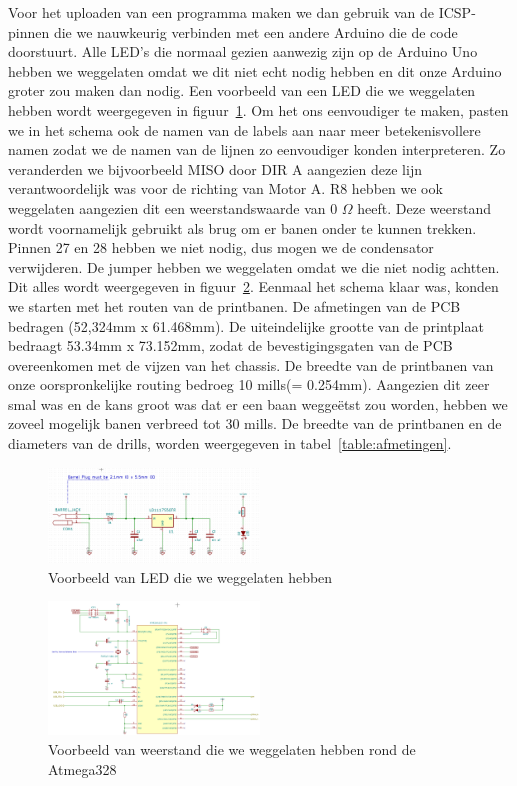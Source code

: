 Voor het uploaden van een programma maken we dan gebruik van de ICSP-pinnen die we nauwkeurig verbinden met een andere Arduino die de code doorstuurt.  Alle LED's die normaal gezien aanwezig zijn op de Arduino Uno hebben we  weggelaten omdat we dit niet echt nodig hebben en dit onze Arduino groter zou maken dan nodig. Een voorbeeld van een LED die we weggelaten hebben wordt weergegeven in figuur~\ref{fig:regulator}. Om het ons eenvoudiger te maken, pasten we in het schema ook de namen van de labels aan naar meer betekenisvollere namen zodat we de namen van de lijnen zo eenvoudiger konden interpreteren. Zo veranderden we bijvoorbeeld MISO door DIR A aangezien deze lijn verantwoordelijk was voor de richting van Motor A. R8 hebben we ook weggelaten aangezien dit een weerstandswaarde van 0 $\Omega$ heeft. Deze weerstand wordt voornamelijk gebruikt als brug om er banen onder te kunnen trekken. Pinnen 27 en 28 hebben we niet nodig, dus mogen we de condensator verwijderen. De jumper hebben we weggelaten omdat we die niet nodig achtten. Dit alles wordt weergegeven in figuur~\ref{fig:atmega}. Eenmaal het schema klaar was, konden we starten met het routen van de printbanen. De afmetingen van de PCB bedragen (52,324mm x 61.468mm). De uiteindelijke grootte van de printplaat bedraagt 53.34mm x 73.152mm, zodat de bevestigingsgaten van de PCB overeenkomen met de vijzen van het chassis.  De breedte van de printbanen van onze oorspronkelijke routing bedroeg 10 mills(= 0.254mm). Aangezien dit zeer smal was en de kans groot was dat er een baan wegge\"etst zou worden, hebben we zoveel mogelijk banen verbreed tot 30 mills. De breedte van de printbanen en de diameters van de drills, worden weergegeven in tabel~\ref{table:afmetingen}.\\
\begin{figure}[h]
\centering
\includegraphics[width=0.5\textwidth]{Voltage_Regulator.png}
\caption{Voorbeeld van LED die we weggelaten hebben}
\label{fig:regulator}
\end{figure}

\begin{figure}[h]
\centering
\includegraphics[width=0.5\textwidth]{Atmega.png}
\caption{Voorbeeld van weerstand die we weggelaten hebben rond de Atmega328}
\label{fig:atmega}
\end{figure}

